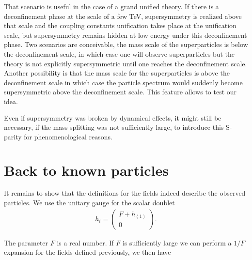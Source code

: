 \documentclass[a4paper,12pt]{article}
\begin{document}
That scenario is useful in the case of a grand unified theory.  If
there is a deconfinement phase at the scale of a few TeV,
supersymmetry is realized above that scale and the coupling constants
unification takes place at the unification scale, but supersymmetry
remains hidden at low energy under this deconfinement phase.  Two
scenarios are conceivable, the mass scale of the superparticles is
below the deconfinement scale, in which case one will observe
superparticles but the theory is not explicitly supersymmetric until
one reaches the deconfinement scale.  Another possibility is that the
mass scale for the superparticles is above the deconfinement scale in
which case the particle spectrum would suddenly become supersymmetric
above the deconfinement scale. This feature allows to test our idea.




Even if supersymmetry was broken by dynamical effects, it might still
be necessary, if the mass splitting was not sufficiently large, to
introduce this S-parity for phenomenological reasons.

\section{Back to known particles}

It remains to show that the definitions for the fields indeed describe
the observed particles. We use the unitary gauge for the scalar doublet
\begin{eqnarray}
   h_i=\left ( \begin{array}{c} F+h_{(1)} \\ 0 \end{array}\right).
\end{eqnarray}

The parameter $F$ is a real number.  If $F$ is sufficiently
large we can perform a $1/F$ expansion for the fields defined
previously, we then have
\end{document}
